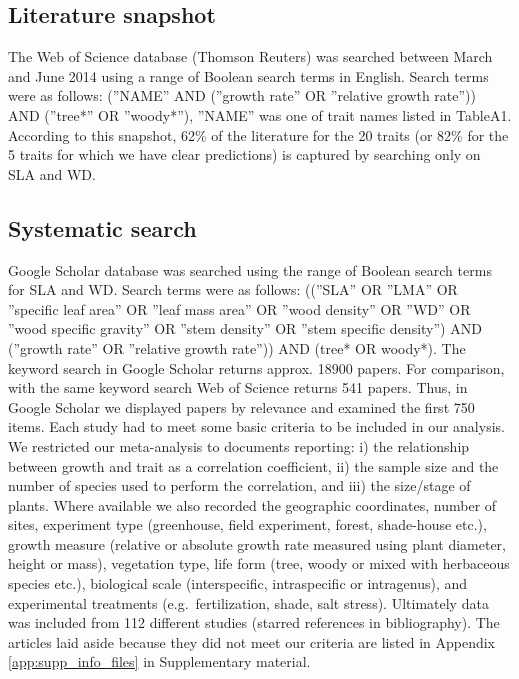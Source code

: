 \documentclass[a4paper]{article}\usepackage[]{graphicx}\usepackage[]{color}
\begin{document}
\subsection*{Literature snapshot}\label{literature-snapshot}

The Web of Science database (Thomson Reuters) was searched between March and June 2014 using a range of Boolean search terms in English. Search terms were as follows: (''NAME'' AND (''growth rate'' OR ''relative growth rate'')) AND (''tree*'' OR ''woody*''), ''NAME'' was one of trait names listed in TableA1. According to this snapshot, 62\% of the literature for the 20 traits (or 82\% for the 5 traits for which we have clear predictions) is captured by searching only on SLA and WD.

\subsection*{Systematic search}\label{systematic-search}

Google Scholar database was searched using the range of Boolean search terms for SLA and WD. Search terms were as follows: ((''SLA'' OR ''LMA'' OR ''specific leaf area'' OR ''leaf mass area'' OR ''wood density'' OR ''WD'' OR ''wood specific gravity'' OR ''stem density'' OR ''stem specific density'') AND (''growth rate'' OR ''relative growth rate'')) AND (tree* OR woody*). The keyword search in Google Scholar returns approx. 18900 papers. For comparison, with the same keyword search Web of Science returns 541 papers. Thus, in Google Scholar we displayed papers by relevance and examined the first 750 items. 
Each study had to meet some basic criteria to be included in our analysis. We restricted our meta-analysis to documents reporting: i) the relationship between growth and trait as a correlation coefficient, ii) the sample size and the number of species used to perform the correlation, and iii) the size/stage of plants. Where available we also recorded the geographic coordinates, number of sites, experiment type (greenhouse, field experiment, forest, shade-house etc.), growth measure (relative or absolute growth rate measured using plant diameter, height or mass), vegetation type, life form (tree, woody or mixed with herbaceous species etc.), biological scale (interspecific, intraspecific or intragenus), and experimental treatments (e.g.~fertilization, shade, salt stress). Ultimately data was included from 112 different studies (starred references in bibliography). The articles laid aside because they did not meet our criteria are listed in Appendix \ref{app:supp_info_files} in Supplementary material.
\end{document}
